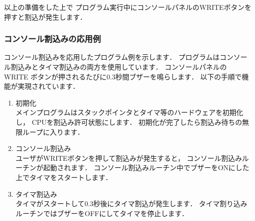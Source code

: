 以上の準備をした上で
プログラム実行中にコンソールパネルのWRITEボタンを押すと割込が発生します．

\subsubsection{コンソール割込みの応用例}

コンソール割込みを応用したプログラム例を示します．
プログラムはコンソール割込みとタイマ割込みの両方を使用しています．
コンソールパネルの WRITE ボタンが押されるたびに0.3秒間ブザーを鳴らします．
以下の手順で機能が実現されています．

\begin{enumerate}
\item 初期化 \\
メインプログラムはスタックポインタとタイマ等のハードウェアを初期化し，
CPUを割込み許可状態にします．
初期化が完了したら割込み待ちの無限ループに入ります．

\item コンソール割込み \\
ユーザがWRITEボタンを押して割込みが発生すると，
コンソール割込みルーチンが起動されます．
コンソール割込みルーチン中でブザーをONにした上でタイマをスタートします．

\item タイマ割込み \\
タイマがスタートして0.3秒後にタイマ割込が発生します．
タイマ割り込みルーチンではブザーをOFFにしてタイマを停止します．

\end{enumerate}

